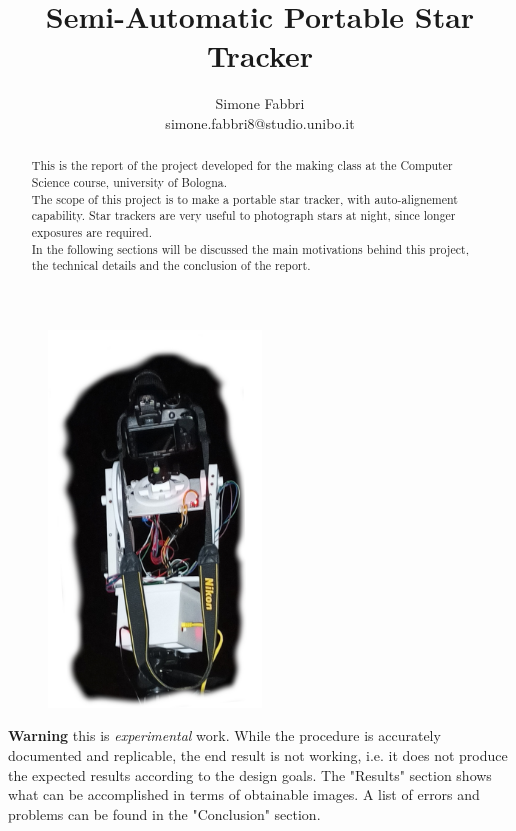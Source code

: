 \documentclass[]{article}
\title{Semi-Automatic Portable Star Tracker}
\author{Simone Fabbri \\ simone.fabbri8@studio.unibo.it}
\begin{document}
\maketitle

\begin{figure}[h]
	\centering
	\includegraphics[width=0.5\linewidth, height=10cm]{images/cover/cover}
\end{figure}

\begin{abstract}
This is the report of the project developed for the making class at the Computer Science course, university of Bologna.
\\
The scope of this project is to make a portable star tracker, with auto-alignement capability. Star trackers are very useful to photograph stars at night, since longer exposures are required. 
\\
In the following sections will be discussed the main motivations behind this project, the technical details and the conclusion of the report.

\end{abstract}

\begin{tcolorbox}[colback=red!5!white,colframe=red!75!black]
	\textbf{Warning} this is \textit{experimental} work. While the procedure is accurately documented and replicable, the end result is not working, i.e. it does not produce the expected results according to the design goals. The "Results" section shows what can be accomplished in terms of obtainable images. A list of errors and problems can be found in the "Conclusion" section. 
\end{tcolorbox}
\end{document}
